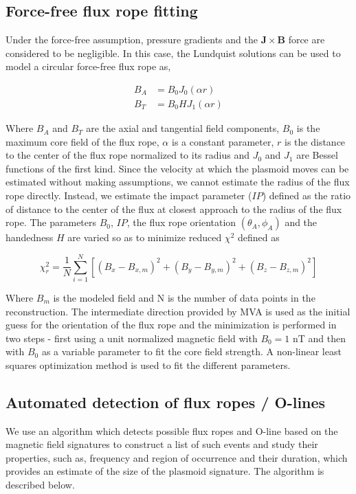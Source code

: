 \subsection{Force-free flux rope fitting}
Under the force-free assumption, pressure gradients and the $\mathbf{J}\times\mathbf{B}$ force are considered to be negligible. In this case, the Lundquist solutions can be used to model a circular force-free flux rope \cite{Lepping1990MagneticAU,Slavin2003GeotailSheet} as, 

\begin{align}
    B_A & = B_0 J_0 \left( \alpha r \right)\\
    B_T & = B_0 H J_1 \left( \alpha r \right)
\end{align}

Where $B_A$ and $B_T$ are the axial and tangential field components, $B_0$ is the maximum core field of the flux rope, $\alpha$ is a constant parameter, $r$ is the distance to the center of the flux rope normalized to its radius and $J_0$ and $J_1$ are Bessel functions of the first kind. Since the velocity at which the plasmoid moves can be estimated without making assumptions, we cannot estimate the radius of the flux rope directly. Instead, we estimate the impact parameter ($IP$) defined as the ratio of distance to the center of the flux at closest approach to the radius of the flux rope. The parameters $B_0$, $IP$, the flux rope orientation $(\theta_A, \phi_A)$ and the handedness $H$ are varied so as to minimize reduced $\chi^2$ defined as \cite{Lepping1990MagneticAU}

\begin{equation}
    \chi_r^2 = \frac{1}{N} \sum_{i=1}^{N} \left[ \left(B_x - B_{x,m} \right)^2 + \left(B_y - B_{y,m} \right)^2 + \left(B_z - B_{z,m} \right)^2 \right]
\end{equation}

Where $B_m$ is the modeled field and N is the number of data points in the reconstruction. The intermediate direction provided by MVA is used as the initial guess for the orientation of the flux rope  and the minimization is performed in two steps - first using a unit normalized magnetic field with $B_0=1$ nT and then with $B_0$ as a variable parameter to fit the core field strength. A non-linear least squares optimization method is used to fit the different parameters. 

\subsection{Automated detection of flux ropes / O-lines}
We use an algorithm which detects possible flux ropes and O-line based on the magnetic field signatures to construct a list of such events and study their properties, such as, frequency and region of occurrence and their duration, which provides an estimate of the size of the plasmoid signature. The algorithm is described below. 

